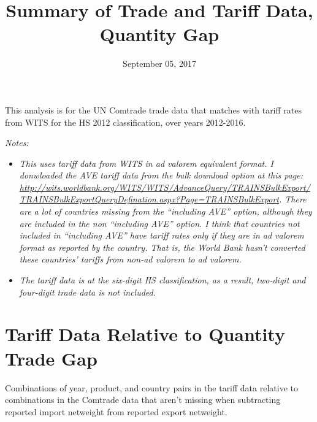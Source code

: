 \documentclass[10pt,]{article}
\title{Summary of Trade and Tariff Data, Quantity Gap}
\author{}
\date{September 05, 2017}
\begin{document}
\maketitle

This analysis is for the UN Comtrade trade data that matches with tariff
rates from WITS for the HS 2012 classification, over years 2012-2016.

\emph{Notes:}

\begin{itemize}
\item
  \emph{This uses tariff data from WITS in ad valorem equivalent format.
  I donwloaded the AVE tariff data from the bulk download option at this
  page:
  \url{http://wits.worldbank.org/WITS/WITS/AdvanceQuery/TRAINSBulkExport/TRAINSBulkExportQueryDefination.aspx?Page=TRAINSBulkExport}.
  There are a lot of countries missing from the ``including AVE''
  option, although they are included in the non ``including AVE''
  option. I think that countries not included in ``including AVE'' have
  tariff rates only if they are in ad valorem format as reported by the
  country. That is, the World Bank hasn't converted these countries'
  tariffs from non-ad valorem to ad valorem.}
\item
  \emph{The tariff data is at the six-digit HS classification, as a
  result, two-digit and four-digit trade data is not included.}
\end{itemize}

\section{Tariff Data Relative to Quantity Trade
Gap}\label{tariff-data-relative-to-quantity-trade-gap}

Combinations of year, product, and country pairs in the tariff data
relative to combinations in the Comtrade data that aren't missing when
subtracting reported import netweight from reported export netweight.
\end{document}
